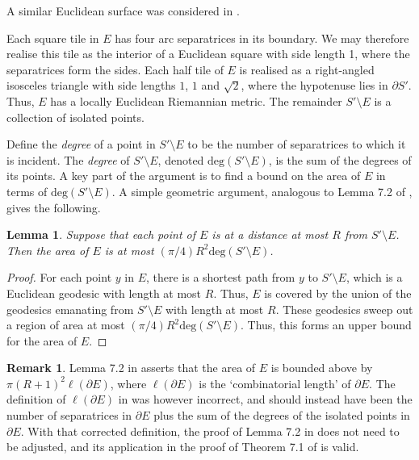 \documentclass[oneside]{amsart}
\numberwithin{equation}{section}
\theoremstyle{plain}
\newtheorem{lemma}[equation]{Lemma}
\theoremstyle{definition}
\newtheorem{remark}[equation]{Remark}
\begin{document}
A similar Euclidean surface was considered in \cite{Lackenby:PolyUnknot}. 

Each square tile in $E$ has four arc separatrices in its boundary.
We may therefore realise this tile as the interior of a Euclidean square with side length 1, where 
the separatrices form the sides. 
Each half tile of $E$ is realised as a right-angled isosceles triangle with side lengths $1$, $1$ and $\sqrt 2$,
where the hypotenuse lies in $\partial S'$. 
Thus, $E$ has a locally Euclidean Riemannian metric. The remainder $S' \setminus E$
is a collection of isolated points.

Define the \emph{degree} of a point in $S' \setminus E$ to be the number of separatrices to which it
is incident. The \emph{degree} of $S' \setminus E$, denoted $\mathrm{deg}(S' \setminus E)$, is the sum of the degrees of its points.
A key part of the argument is to find a bound on the area of $E$ in terms of 
$\mathrm{deg}(S' \setminus E)$. A simple geometric argument, analogous to Lemma 7.2 of \cite{Lackenby:PolyUnknot}, gives the following.

\begin{lemma}
\label{Lem:AreaEuclidean}
Suppose that each point of $E$ is at a distance at most $R$ from $S' \setminus E$.
Then the area of $E$ is at most $(\pi/4)R^2 \mathrm{deg}(S' \setminus E)$.
\end{lemma}

\begin{proof}
For each point $y$ in $E$, there is a shortest path from $y$ to $S' \setminus E$,
which is a Euclidean geodesic with length at most $R$. Thus, $E$ is covered by 
the union of the geodesics emanating from $S' \setminus E$ with length at most $R$.
These geodesics sweep out a region of area at most $(\pi/4)R^2 \mathrm{deg}(S' \setminus E)$.
Thus, this forms an upper bound for the area of $E$.
\end{proof}

\begin{remark}
Lemma 7.2 in \cite{Lackenby:PolyUnknot} asserts that the area of $E$ is bounded above by
$\pi(R+1)^2 \ell(\partial E)$, where $\ell(\partial E)$ is the `combinatorial length'
of $\partial E$. The definition of $\ell(\partial E)$ in \cite{Lackenby:PolyUnknot}
was however incorrect, and should instead have been the number of separatrices in $\partial E$
plus the sum of the degrees of the isolated points in $\partial E$.
With that corrected definition, the proof of Lemma 7.2 in \cite{Lackenby:PolyUnknot} does not
need to be adjusted, and its application in the proof of Theorem 7.1 of \cite{Lackenby:PolyUnknot} is valid.
\end{remark}
\end{document}
